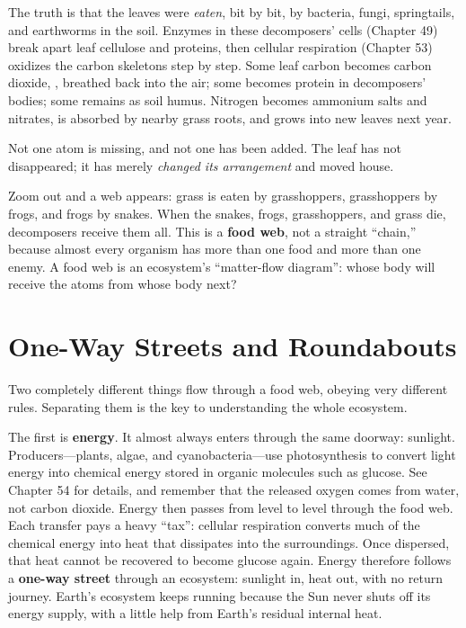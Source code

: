 The truth is that the leaves were \emph{eaten}, bit by bit, by bacteria, fungi, springtails, and earthworms in the soil. Enzymes in these decomposers' cells (Chapter 49) break apart leaf cellulose and proteins, then cellular respiration (Chapter 53) oxidizes the carbon skeletons step by step. Some leaf carbon becomes carbon dioxide, , breathed back into the air; some becomes protein in decomposers' bodies; some remains as soil humus. Nitrogen becomes ammonium salts and nitrates, is absorbed by nearby grass roots, and grows into new leaves next year.

Not one atom is missing, and not one has been added. The leaf has not disappeared; it has merely \emph{changed its arrangement} and moved house.

Zoom out and a web appears: grass is eaten by grasshoppers, grasshoppers by frogs, and frogs by snakes. When the snakes, frogs, grasshoppers, and grass die, decomposers receive them all. This is a \textbf{food web}, not a straight ``chain,'' because almost every organism has more than one food and more than one enemy. A food web is an ecosystem's ``matter-flow diagram'': whose body will receive the atoms from whose body next?

\section{One-Way Streets and Roundabouts}

Two completely different things flow through a food web, obeying very different rules. Separating them is the key to understanding the whole ecosystem.

The first is \textbf{energy}. It almost always enters through the same doorway: sunlight. Producers---plants, algae, and cyanobacteria---use photosynthesis to convert light energy into chemical energy stored in organic molecules such as glucose. See Chapter 54 for details, and remember that the released oxygen comes from water, not carbon dioxide. Energy then passes from level to level through the food web. Each transfer pays a heavy ``tax'': cellular respiration converts much of the chemical energy into heat that dissipates into the surroundings. Once dispersed, that heat cannot be recovered to become glucose again. Energy therefore follows a \textbf{one-way street} through an ecosystem: sunlight in, heat out, with no return journey. Earth's ecosystem keeps running because the Sun never shuts off its energy supply, with a little help from Earth's residual internal heat.

